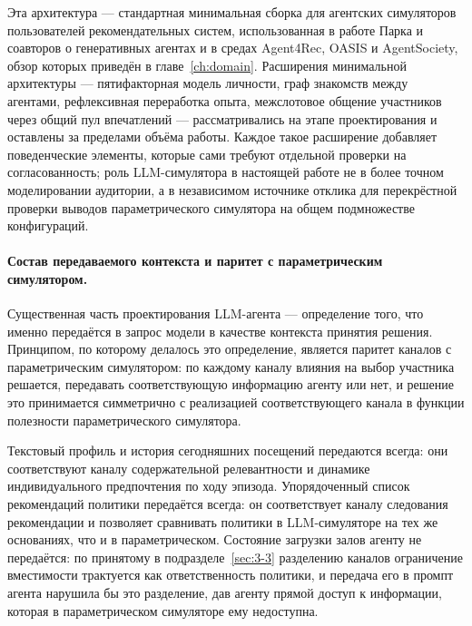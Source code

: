 Эта архитектура --- стандартная минимальная сборка для агентских симуляторов пользователей рекомендательных систем, использованная в работе Парка и соавторов о генеративных агентах и в средах Agent4Rec, OASIS и AgentSociety, обзор которых приведён в главе~\ref{ch:domain}. Расширения минимальной архитектуры --- пятифакторная модель личности, граф знакомств между агентами, рефлексивная переработка опыта, межслотовое общение участников через общий пул впечатлений --- рассматривались на этапе проектирования и оставлены за пределами объёма работы. Каждое такое расширение добавляет поведенческие элементы, которые сами требуют отдельной проверки на согласованность; роль LLM-симулятора в настоящей работе не в более точном моделировании аудитории, а в независимом источнике отклика для перекрёстной проверки выводов параметрического симулятора на общем подмножестве конфигураций.

\paragraph{Состав передаваемого контекста и паритет с параметрическим симулятором.}
Существенная часть проектирования LLM-агента --- определение того, что именно передаётся в запрос модели в качестве контекста принятия решения. Принципом, по которому делалось это определение, является паритет каналов с параметрическим симулятором: по каждому каналу влияния на выбор участника решается, передавать соответствующую информацию агенту или нет, и решение это принимается симметрично с реализацией соответствующего канала в функции полезности параметрического симулятора.

Текстовый профиль и история сегодняшних посещений передаются всегда: они соответствуют каналу содержательной релевантности и динамике индивидуального предпочтения по ходу эпизода. Упорядоченный список рекомендаций политики передаётся всегда: он соответствует каналу следования рекомендации и позволяет сравнивать политики в LLM-симуляторе на тех же основаниях, что и в параметрическом. Состояние загрузки залов агенту не передаётся: по принятому в подразделе~\ref{sec:3-3} разделению каналов ограничение вместимости трактуется как ответственность политики, и передача его в промпт агента нарушила бы это разделение, дав агенту прямой доступ к информации, которая в параметрическом симуляторе ему недоступна.

